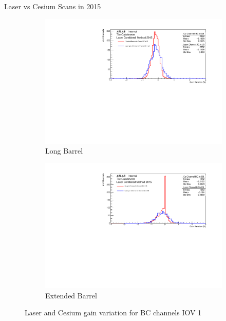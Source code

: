 \documentclass{beamer}
\begin{document}
\begin{frame}{Laser vs Cesium Scans in 2015}
\begin{figure}[H]
\centering
\begin{subfigure} [t] {0.49\textwidth}
\includegraphics[width=\textwidth]{cs1d_bc_lb_iov1.pdf}
\caption{Long Barrel}
\end{subfigure}
\begin{subfigure} [t] {0.49\textwidth}
\includegraphics[width=\textwidth]{cs1d_bc_eb_iov1.pdf}
\caption{Extended Barrel}
\end{subfigure}
\caption{Laser and Cesium gain variation for BC channels IOV 1}
\end{figure}
\end{frame}
\end{document}
